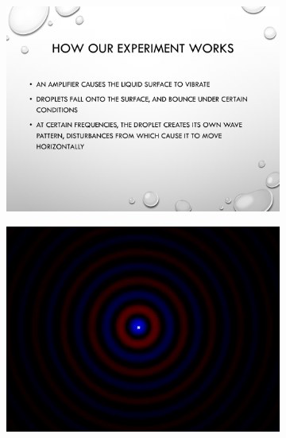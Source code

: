 \begin{figure}
\begin{subfigure}{0.475\textwidth}
\includegraphics[width=\textwidth]{education/ppt/07.png}
\end{subfigure}
\hfill
\begin{subfigure}{0.475\textwidth}
\includegraphics[width=\textwidth]{education/ppt/08.png}
\end{subfigure}
\\


\end{figure}
